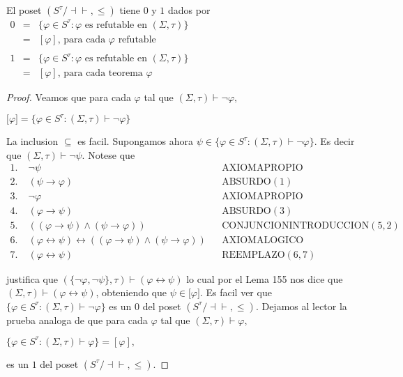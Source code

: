   \begin{lemma}
    El poset \((S^{\tau }/\mathrm{\dashv \vdash },\leq )\) tiene \(0\) y \(1\) dados por
    \(\displaystyle \begin{array}{lll} 0 & = & \{\varphi \in S^{\tau }:\varphi \text{ es refutable en }(\Sigma ,\tau )\} \\ & = & [\varphi ]\text{, para cada }\varphi \text{ refutable} \\ & & \\ 1 & = & \{\varphi \in S^{\tau }:\varphi \text{ es refutable en }(\Sigma ,\tau )\} \\ & = & [\varphi ]\text{, para cada teorema }\varphi \end{array} \)
  \end{lemma}
  \begin{proof}
    Veamos que para cada \(\varphi \) tal que \((\Sigma ,\tau )\vdash \lnot \varphi ,\)

    \(\displaystyle \lbrack \varphi ]=\{\varphi \in S^{\tau }:(\Sigma ,\tau )\vdash \lnot \varphi \} \)

    La inclusion \(\subseteq \) es facil. Supongamos ahora \(\psi \in \{\varphi \in S^{\tau }:(\Sigma ,\tau )\vdash \lnot \varphi \}.\) Es decir que \((\Sigma ,\tau )\vdash \lnot \psi .\) Notese que
    \(\displaystyle \begin{array}{llll} 1.\; & \lnot \psi & & \text{AXIOMAPROPIO} \\ 2.\; & \left( \psi \rightarrow \varphi \right) & & \text{ABSURDO}(1) \\ 3.\; & \lnot \varphi & & \text{AXIOMAPROPIO} \\ 4.\; & (\varphi \rightarrow \psi ) & & \text{ABSURDO}(3) \\ 5. & ((\varphi \rightarrow \psi )\wedge (\psi \rightarrow \varphi )) & & \text{CONJUNCIONINTRODUCCION}(5,2) \\ 6. & (\varphi \leftrightarrow \psi )\leftrightarrow ((\varphi \rightarrow \psi )\wedge (\psi \rightarrow \varphi )) & & \text{AXIOMALOGICO} \\ 7. & (\varphi \leftrightarrow \psi ) & & \text{REEMPLAZO}(6,7) \end{array} \)

    justifica que \((\{\lnot \varphi ,\lnot \psi \},\tau )\vdash (\varphi \leftrightarrow \psi )\) lo cual por el Lema 155 nos dice que \((\Sigma ,\tau )\vdash (\varphi \leftrightarrow \psi )\), obteniendo que \( \psi \in \lbrack \varphi ].\)
    Es facil ver que \(\{\varphi \in S^{\tau }:(\Sigma ,\tau )\vdash \lnot \varphi \}\) es un \(0\) del poset \((S^{\tau }/\mathrm{\dashv \vdash },\leq ).\) Dejamos al lector la prueba analoga de que para cada \(\varphi \) tal que \( (\Sigma ,\tau )\vdash \varphi ,\)

    \(\displaystyle \{\varphi \in S^{\tau }:(\Sigma ,\tau )\vdash \varphi \}=[\varphi ], \)

    es un \(1\) del poset \((S^{\tau }/\mathrm{\dashv \vdash },\leq ).\)
  \end{proof}

